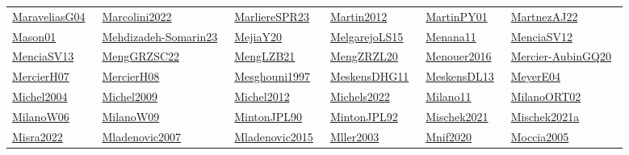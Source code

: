 \begin{longtable}{*{6}{l}}
\href{../works/MaraveliasG04.pdf}{MaraveliasG04}~\cite{MaraveliasG04} & \href{../}{Marcolini2022}~\cite{Marcolini2022} & \href{../works/MarliereSPR23.pdf}{MarliereSPR23}~\cite{MarliereSPR23} & \href{../}{Martin2012}~\cite{Martin2012} & \href{../works/MartinPY01.pdf}{MartinPY01}~\cite{MartinPY01} & \href{../}{MartnezAJ22}~\cite{MartnezAJ22}\\ 
\href{../works/Mason01.pdf}{Mason01}~\cite{Mason01} & \href{../works/Mehdizadeh-Somarin23.pdf}{Mehdizadeh-Somarin23}~\cite{Mehdizadeh-Somarin23} & \href{../works/MejiaY20.pdf}{MejiaY20}~\cite{MejiaY20} & \href{../works/MelgarejoLS15.pdf}{MelgarejoLS15}~\cite{MelgarejoLS15} & \href{../works/Menana11.pdf}{Menana11}~\cite{Menana11} & \href{../works/MenciaSV12.pdf}{MenciaSV12}~\cite{MenciaSV12}\\ 
\href{../works/MenciaSV13.pdf}{MenciaSV13}~\cite{MenciaSV13} & \href{../works/MengGRZSC22.pdf}{MengGRZSC22}~\cite{MengGRZSC22} & \href{../works/MengLZB21.pdf}{MengLZB21}~\cite{MengLZB21} & \href{../works/MengZRZL20.pdf}{MengZRZL20}~\cite{MengZRZL20} & \href{../}{Menouer2016}~\cite{Menouer2016} & \href{../works/Mercier-AubinGQ20.pdf}{Mercier-AubinGQ20}~\cite{Mercier-AubinGQ20}\\ 
\href{../works/MercierH07.pdf}{MercierH07}~\cite{MercierH07} & \href{../works/MercierH08.pdf}{MercierH08}~\cite{MercierH08} & \href{../}{Mesghouni1997}~\cite{Mesghouni1997} & \href{../works/MeskensDHG11.pdf}{MeskensDHG11}~\cite{MeskensDHG11} & \href{../works/MeskensDL13.pdf}{MeskensDL13}~\cite{MeskensDL13} & \href{../works/MeyerE04.pdf}{MeyerE04}~\cite{MeyerE04}\\ 
\href{../}{Michel2004}~\cite{Michel2004} & \href{../}{Michel2009}~\cite{Michel2009} & \href{../}{Michel2012}~\cite{Michel2012} & \href{../}{Michels2022}~\cite{Michels2022} & \href{../}{Milano11}~\cite{Milano11} & \href{../}{MilanoORT02}~\cite{MilanoORT02}\\ 
\href{../works/MilanoW06.pdf}{MilanoW06}~\cite{MilanoW06} & \href{../works/MilanoW09.pdf}{MilanoW09}~\cite{MilanoW09} & \href{../works/MintonJPL90.pdf}{MintonJPL90}~\cite{MintonJPL90} & \href{../works/MintonJPL92.pdf}{MintonJPL92}~\cite{MintonJPL92} & \href{../}{Mischek2021}~\cite{Mischek2021} & \href{../}{Mischek2021a}~\cite{Mischek2021a}\\ 
\href{../}{Misra2022}~\cite{Misra2022} & \href{../}{Mladenovic2007}~\cite{Mladenovic2007} & \href{../}{Mladenovic2015}~\cite{Mladenovic2015} & \href{../}{Mller2003}~\cite{Mller2003} & \href{../}{Mnif2020}~\cite{Mnif2020} & \href{../}{Moccia2005}~\cite{Moccia2005}\\ 

\end{longtable}
